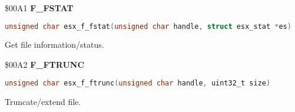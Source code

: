 \$00A1 \textbf{F\_FSTAT}

\begin{lstlisting}[language=C]
unsigned char esx_f_fstat(unsigned char handle, struct esx_stat *es)
\end{lstlisting}

Get file information/status.

%

\$00A2 \textbf{F\_FTRUNC}

\begin{lstlisting}[language=C]
unsigned char esx_f_ftrunc(unsigned char handle, uint32_t size)
\end{lstlisting}

Truncate/extend file.

%

